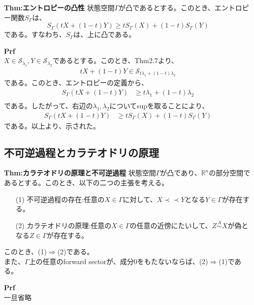 \documentclass[a4paper,11pt]{jsarticle}
\begin{document}
\begin{itembox}[l]{\textbf{Thm:エントロピーの凸性}}
    状態空間$\Gamma$が凸であるとする。このとき、エントロピー関数$S_{\Gamma}$は、
    \begin{equation}
        S_{\Gamma}(tX+(1-t)Y) \geq tS_{\Gamma}(X)+(1-t)S_{\Gamma}(Y)
    \end{equation}
    である。すなわち、$S_{\Gamma}$は、上に凸である。
\end{itembox}
\textbf{Prf}\\
$X \in \mathcal{S}_{\lambda_1},Y \in \mathcal{S}_{\lambda_2}$であるとする。このとき、Thm2.7より、
\begin{align}
    tX+(1-t)Y \in \mathcal{S}_{t\lambda_1+(1-t)\lambda_2}
\end{align}
である。このとき、エントロピーの定義から、
\begin{align}
    S_{\Gamma}(tX+(1-t)Y) &\geq t\lambda_1+(1-t)\lambda_2\\
\end{align}
である。したがって、右辺の$\lambda_1,\lambda_2$についてsupを取ることにより、
\begin{align}
    S_{\Gamma}(tX+(1-t)Y) &\geq tS_{\Gamma}(X)+(1-t)S_{\Gamma}(Y)
\end{align}
である。以上より、示された。\hfill\qedsymbol\\

\subsection{不可逆過程とカラテオドリの原理}
\begin{itembox}[l]{\textbf{Thm:カラテオドリの原理と不可逆過程}}
    状態空間$\Gamma$が凸であり、$\mathbb{R}^n$の部分空間であるとする。このとき、以下の二つの主張を考える。
    \begin{itemize}
        \item[(1)] 不可逆過程の存在:任意の$X \in \Gamma$に対して、$X \prec \prec Y$となる$Y \in \Gamma$が存在する。
        \item[(2)] カラテオドリの原理:任意の$X \in \Gamma$の任意の近傍にたいして、$Z \overset{A}{\sim} X$が偽となる$Z \in \Gamma$が存在する。 
    \end{itemize}
    このとき、(1)$\Rightarrow$(2)である。\\
また、$\Gamma$上の任意のforward sectorが、成分0をもたないならば、(2)$\Rightarrow$(1)である。
\end{itembox}
\textbf{Prf}\\
一旦省略\\
\end{document}
